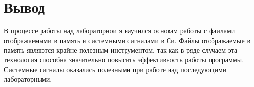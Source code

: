 \section{Вывод}

В процессе работы над лабораторной я научился основам работы с файлами отображаемыми в память и системными сигналами в Си. Файлы отображаемые в память являются крайне полезным инструментом, так как в ряде случаем эта технология способна значительно повысить эффективность работы программы. Системные сигналы оказались полезными при работе над последующими лабораторными.

